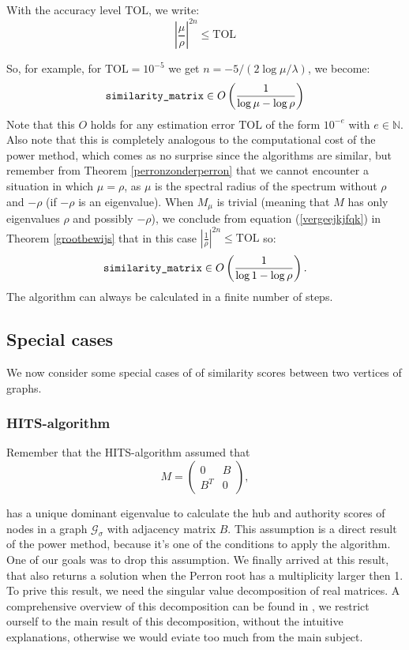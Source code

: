 \documentclass[a4paper,11pt]{report}
\newcommand{\N}{{\mathbb N}}
\newcommand{\graf}{\mathscr{G}}
\newcommand{\tol}{\text{TOL}}
\begin{document}
With the accuracy level $\tol$, we write:
$$\left|\frac{\mu}{\rho} \right|^{2n} \leq \tol$$

So, for example, for $\tol = 10^{-5}$ we get $n = -5/(2\log{\mu/\lambda})$, we become:
$$\text{\texttt{similarity\_matrix}} \in O\left(\frac{1}{\log{\mu- \log\rho}}\right)$$
Note that this $O$ holds for any estimation error $\tol$ of the form $10^{-e}$ with $e \in \N$. 
Also note that this is completely analogous to the computational cost of the 
power method, which comes as no surprise since the algorithms are similar, but remember 
from Theorem \ref{perronzonderperron} that we cannot encounter a situation in 
which $\mu = \rho$, as $\mu$ is the spectral radius
of the spectrum without $\rho$ and $-\rho$ (if $-\rho$ is an eigenvalue). When $M_\mu$ 
is trivial (meaning that $M$ has only eigenvalues $\rho$ and possibly $-\rho$), we conclude from 
equation
(\ref{vergeejkjfqk}) in Theorem \ref{grootbewijs} that in this case $\left|\frac{1}{\rho} \right|^{2n} \leq \tol$ so:
$$\text{\texttt{similarity\_matrix}} \in O\left(\frac{1}{\log{1- \log\rho}}\right).$$
The algorithm can always be calculated in a finite number of steps.
\subsection{Special cases}\label{specialcases}
We now consider some special cases of of similarity scores between two vertices 
of graphs.
\subsubsection{HITS-algorithm}
Remember that the HITS-algorithm assumed that
$$M =  \begin{pmatrix} 
0 & B\\
B^T & 0
\end{pmatrix},$$ 

has a unique dominant eigenvalue to 
calculate the hub and authority scores of nodes in a graph $\graf_\sigma$ with adjacency matrix
$B$. This assumption is a direct result of the power method, because it's one 
of the conditions to apply the algorithm. One of our goals was to drop this 
assumption. We finally arrived at 
this result, that also returns a solution when the Perron root has a 
multiplicity larger then 1. To prive this result, we need the singular value 
decomposition of real matrices. A comprehensive overview of this decomposition 
can be found in \cite{tomasi}, we restrict ourself to the main result of this 
decomposition, without the intuitive explanations, otherwise we would eviate too 
much from the main subject.
\end{document}
